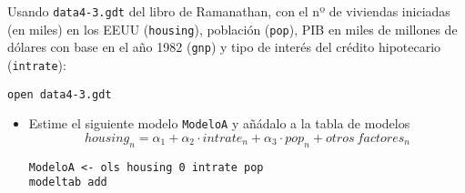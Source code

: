 \documentclass[11pt]{article}
\begin{document}
Usando \texttt{data4-3.gdt} del libro de Ramanathan, con el nº de viviendas
iniciadas (en miles) en los EEUU (\texttt{housing}), población (\texttt{pop}), PIB
en miles de millones de dólares con base en el año 1982 (\texttt{gnp}) y tipo
de interés del crédito hipotecario (\texttt{intrate}):
{\vspace{0pt} \color{gray!70!black}
\begin{verbatim}
open data4-3.gdt
\end{verbatim}
}

\begin{itemize}
\item Estime el siguiente modelo \texttt{ModeloA} y añádalo a la tabla de modelos
\begin{displaymath}
  housing_{n} = \alpha_1 + \alpha_2\cdot intrate_n +  \alpha_3 \cdot pop_n + otros\ factores_n
\end{displaymath}
{\vspace{0pt} \color{gray!70!black}
\begin{verbatim}
ModeloA <- ols housing 0 intrate pop
modeltab add
\end{verbatim}
}
\end{itemize}
\end{document}

